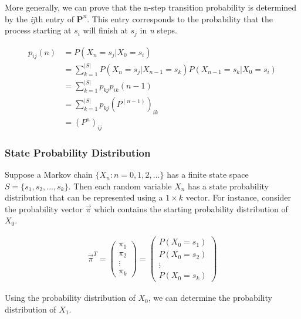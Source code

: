 \documentclass[a4paper, 12pt]{article}
\begin{document}
	More generally, we can prove that the n-step transition probability is determined by the \emph{ij}th entry of $\textbf{P}^n$. 
	This entry corresponds to the probability that the process starting at \emph{$s_i$} will finish at \emph{$s_j$} in \emph{n} 
	steps.
	
	\begin{equation*}
	\begin{aligned}
		p_{ij}(n) &= P(X_n = s_j|X_0 = s_i) \\
				  &= \sum_{k=1}^{|S|} P(X_n = s_j|X_{n-1} = s_k)P(X_{n-1} = s_k | X_0 = s_i) \\
				  &= \sum_{k=1}^{|S|} p_{kj}p_{ik}(n-1) \\
				  &= \sum_{k=1}^{|S|} p_{kj}(P^{(n-1)})_{ik} \\
				  &= (P^n)_{ij}
	\end{aligned}
	\end{equation*}	
	
	\subsubsection*{State Probability Distribution}

Suppose a Markov chain $\{X_n:n=0,1,2,...\}$ has a finite state space $S = \{s_1, s_2,..., s_k\}$. Then each random variable $X_n$ has a state probability distribution that can be represented using a $1 \times k$ vector. For instance, consider the probability vector $\vec{\pi}$ which contains the starting probability distribution of $X_0$.
	
	\begin{equation*}
	\begin{aligned}
		\vec{\pi}^T = \begin{pmatrix}
		 \pi_1 \\
		 \pi_2 \\ 
		 \vdots \\
		 \pi_k
		 \end{pmatrix} = \begin{pmatrix}
		 P(X_0 = s_1) \\
		 P(X_0 = s_2) \\ 
		 \vdots \\
		 P(X_0 = s_k)
		 \end{pmatrix}
	\end{aligned}
	\end{equation*}		
	
Using the probability distribution of $X_0$, we can determine the probability distribution of $X_1$.
\end{document}
